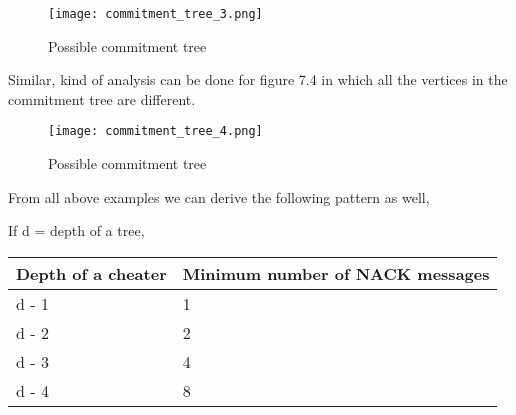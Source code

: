 	\begin{figure}[t]
		\centering
			\texttt{[image: commitment\_tree\_3.png]}
			\caption{Possible commitment tree}
	\end{figure}

	Similar, kind of analysis can be done for figure 7.4 in which all the vertices in the commitment tree are different. 

	\begin{figure}[t]
		\centering
			\texttt{[image: commitment\_tree\_4.png]}
			\caption{Possible commitment tree}
	\end{figure}

	From all above examples we can derive the following pattern as well,

	If d = depth of a tree,\\

	\begin{tabular}{| l | l |}
    \hline
    Depth of a cheater & Minimum number of NACK messages \\ \hline
    d - 1 & 1 \\ \hline
    d - 2 & 2 \\ \hline
    d - 3 & 4 \\ \hline
    d - 4 & 8 \\ \hline
  \end{tabular}



